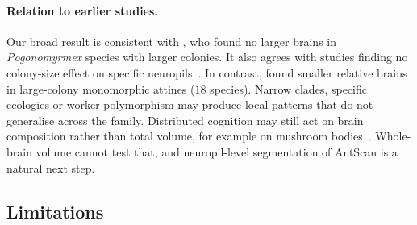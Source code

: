 \documentclass[11pt]{article}
\begin{document}
\paragraph{Relation to earlier studies.} Our broad result is consistent with \citet{perl2026}, who found no larger
brains in \emph{Pogonomyrmex} species with larger colonies. It also agrees with studies finding no colony-size effect
on specific neuropils~\citep{godfrey2020,marty2025}. In contrast, \citet{riveros2012} found smaller relative brains in
large-colony monomorphic attines ($18$ species). Narrow clades, specific ecologies or worker polymorphism may produce
local patterns that do not generalise across the family. Distributed cognition may still act on brain composition
rather than total volume, for example on mushroom bodies~\citep{odonnell2015,kamhi2016,kamhi2019}. Whole-brain volume
cannot test that, and neuropil-level segmentation of AntScan is a natural next step.

\subsection{Limitations}\label{sec:limitations}
\end{document}
